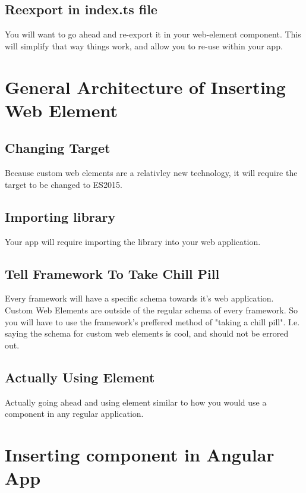 
\subsection{Reexport in index.ts file}
You will want to go ahead and re-export it in your web-element component. This will simplify that way things work, and allow you to re-use within your app. 

\section{General Architecture of Inserting Web Element}
\subsection{Changing Target}
Because custom web elements are a relativley new technology, it will require the target to be changed to ES2015. 

\subsection{Importing library}
Your app will require importing the library into your web application.

\subsection{Tell Framework To Take Chill Pill}
Every framework will have a specific schema towards it's web application. Custom Web Elements are outside of the regular schema of every framework. So you will have to use the framework's preffered method of "taking a chill pill". I.e. saying the schema for custom web elements is cool, and should not be errored out.

\subsection{Actually Using Element}
Actually going ahead and using element similar to how you would use a component in any regular application. 

\section{Inserting component in Angular App}

